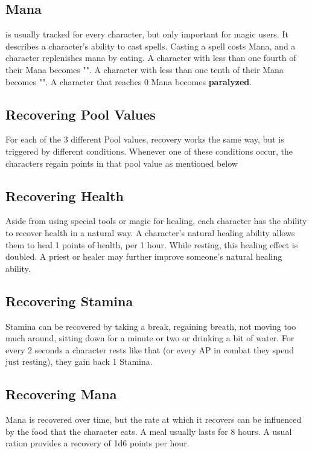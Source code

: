 \subsection{Mana}\label{pool:mana} is usually tracked for every character, but only important for magic users.
It describes a character's ability to cast spells.
Casting a spell costs Mana, and a character replenishes mana by eating.
A character with less than one fourth of their Mana becomes "".
A character with less than one tenth of their Mana becomes "".
A character that reaches 0 Mana becomes \textbf{paralyzed}.\\

\subsection{Recovering Pool Values}\label{subsec:recoveringPoolValues}
For each of the 3 different Pool values, recovery works the same way, but is triggered by different conditions.
Whenever one of these conditions occur, the characters regain points in that pool value as mentioned below

\subsection{Recovering Health}\label{subsec:recoverHealth}
Aside from using special tools or magic for healing, each character has the ability to recover health in a natural way.
A character's natural healing ability allows them to heal 1 points of health, per 1 hour.
While resting, this healing effect is doubled.
A priest or healer may further improve someone's natural healing ability.

\subsection{Recovering Stamina}\label{subsec:recoverStamina}
Stamina can be recovered by taking a break, regaining breath, not moving too much around, sitting down for a minute or two or drinking a bit of water.
For every 2 seconds a character rests like that (or every AP in combat they spend just resting), they gain back 1 Stamina.

\subsection{Recovering Mana}\label{subsec:recoverMana}
Mana is recovered over time, but the rate at which it recovers can be influenced by the food that the character eats.
A meal usually lasts for 8 hours.
A usual ration provides a recovery of 1d6 points per hour.